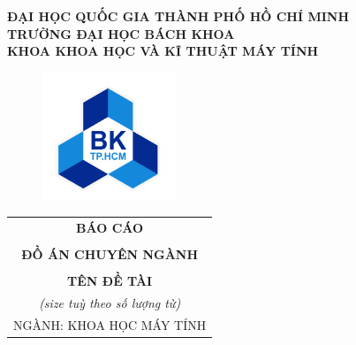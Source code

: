 \documentclass[a4paper]{article}
\theoremstyle{definition}
\begin{document}
\begin{titlepage}

\begin{center}
\LARGE \textbf{ĐẠI HỌC QUỐC GIA THÀNH PHỐ HỒ CHÍ MINH} \\
\vspace{0.2cm}
\LARGE \textbf{TRƯỜNG ĐẠI HỌC BÁCH KHOA} \\
\vspace{0.2cm}
\LARGE \textbf{KHOA KHOA HỌC VÀ KĨ THUẬT MÁY TÍNH}
\end{center}

\vspace{0.3cm}

\begin{figure}[h!]
\begin{center}
\includegraphics[width=4cm]{Images/hcmut.png}
\end{center}
\end{figure}

\begin{center}
\begin{tabular}{c}
\multicolumn{1}{c}{\textbf{{\LARGE BÁO CÁO}}}\\
\\{\textbf{{\LARGE ĐỒ ÁN CHUYÊN NGÀNH}}}
\\
\\
\textbf{\LARGE TÊN ĐỀ TÀI}
\\ \textit{(size tuỳ theo số lượng từ)}

\\ \vspace{0.5cm} {\Large NGÀNH: KHOA HỌC MÁY TÍNH}
\end{tabular}
\end{center}
\vspace{0.5cm}



\end{titlepage}
\end{document}
